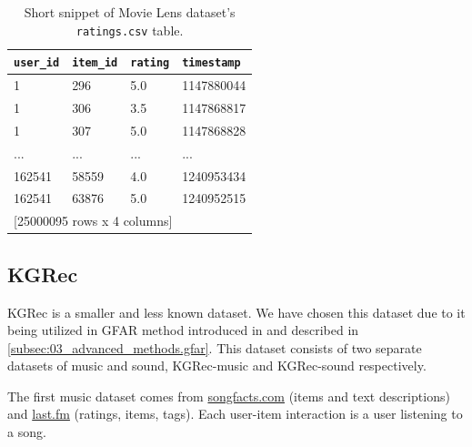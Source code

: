 \begin{table}[!ht]
\centering
\begin{tabular}{ l l l l }

\verb|user_id| & \verb|item_id| & \verb|rating| & \verb|timestamp| \\
    \hline
    1 &      296  &   5.0 & 1147880044 \\
    1 &      306  &   3.5 & 1147868817 \\
    1 &      307  &   5.0 & 1147868828 \\
  ... &      ...  &   ... &        ... \\
162541 &    58559  &   4.0 & 1240953434 \\
162541 &    63876  &   5.0 & 1240952515 \\ [1mm]
\multicolumn{4}{l}{{[25000095 rows x 4 columns]}}
\end{tabular}
\caption{Short snippet of Movie Lens dataset's \texttt{ratings.csv} table.}
\label{table:5.1_ML_ratings}
\end{table}





\subsection{KGRec}
\label{subsec:04_single_user_datasets.kgrec}
KGRec is a smaller and less known dataset. We have chosen this dataset due to it being utilized in GFAR method introduced in \cite{GFAR-kaya2020} and described in \ref{subsec:03_advanced_methods.gfar}. This dataset consists of two separate datasets of music and sound, KGRec-music and KGRec-sound respectively.

The first music dataset comes from \href{https://www.songfacts.com/}{songfacts.com} (items and text descriptions) and \href{https://www.last.fm/}{last.fm} (ratings, items, tags). Each user-item interaction is a user listening to a song.

